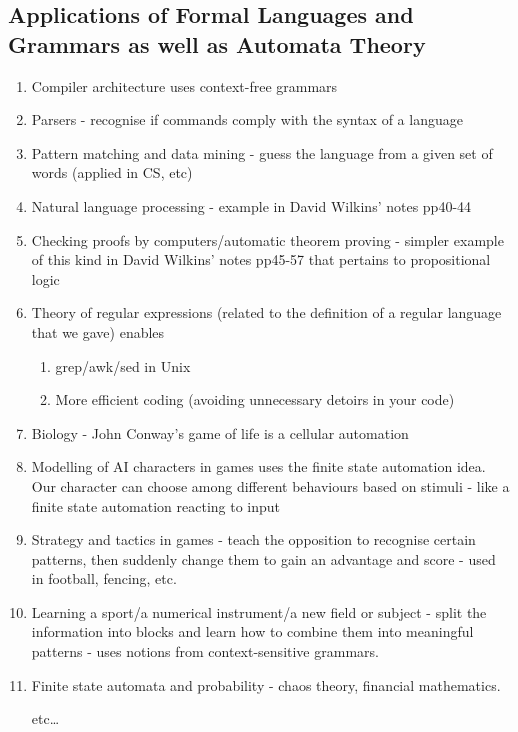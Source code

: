 \documentclass[10pt]{article}
\begin{document}
	\subsection{Applications of Formal Languages and Grammars as well as Automata Theory}
	\begin{enumerate}
		\item Compiler architecture uses context-free grammars
		\item Parsers - recognise if commands comply with the syntax of a language
		\item Pattern matching and data mining - guess the language from a given set of words (applied in CS, etc)
		\item Natural language processing - example in David Wilkins' notes pp40-44
		\item Checking proofs by computers/automatic theorem proving - simpler example of this kind in David Wilkins' notes pp45-57 that pertains to propositional logic
		\item Theory of regular expressions (related to the definition of a regular language that we gave) enables
		\begin{enumerate}
			\item grep/awk/sed in Unix
			\item More efficient coding (avoiding unnecessary detoirs in your code)
		\end{enumerate}
		\item Biology - John Conway's game of life is a cellular automation
		\item Modelling of AI characters in games uses the finite state automation idea. Our character can choose among different behaviours based on stimuli - like a finite state automation reacting to input
		\item Strategy and tactics in games - teach the opposition to recognise certain patterns, then suddenly change them to gain an advantage and score - used in football, fencing, etc.
		\item Learning a sport/a numerical instrument/a new field or subject - split the information into blocks and learn how to combine them into meaningful patterns - uses notions from context-sensitive grammars.
		\item Finite state automata and probability - chaos theory, financial mathematics.
		\item[etc\dots]
	\end{enumerate}
	
\end{document}
